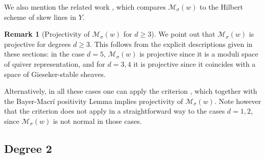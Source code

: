 \documentclass[11pt]{amsart}
\theoremstyle{definition}
\newtheorem{remark}[thm]{Remark}
\DeclareMathOperator{\Ext}{Ext}
\newcommand{\sY}{\mathcal{Y}}
\newcommand{\sM}{\mathcal{M}}
\begin{document}
We also mention the related work \cite{ZYil20}, which compares $\sM_\sigma(w)$ to the Hilbert scheme of skew lines in $Y$.



\begin{remark}[Projectivity of $\sM_\sigma(w)$ for $d\geq 3$]\label{rmk_projectivity345}
We point out that $\sM_\sigma(w)$ is projective for degrees $d\geq 3$. This follows from the explicit descriptions given in these sections: in the case $d=5$, $\sM_\sigma(w)$ is projective since it is a moduli space of quiver representation, and for $d=3,4$ it is projective since it coincides with a space of Gieseker-stable sheaves. 

Alternatively, in all these cases one can apply the criterion \cite[Corollary~1.3]{villalobos2021moishezon}, which together with the Bayer-Macr\'i positivity Lemma \cite[Theorem~4.1]{BM14} implies projectivity of $\sM_\sigma(w)$. Note however that the criterion does not apply in a straightforward way to the cases $d=1,2$, since $\sM_\sigma(w)$ is not normal in those cases. 
\end{remark}


\subsection{Degree 2}
\label{sec_generalitiesY2}
\label{sec_d=2moduli_space}
\end{document}
